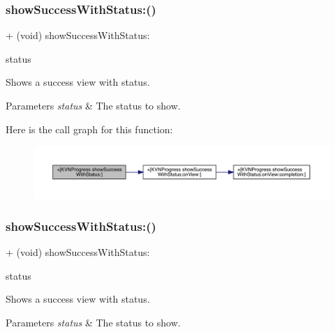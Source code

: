 \subsubsection{\texorpdfstring{show\+Success\+With\+Status\+:()}{showSuccessWithStatus:()}\hspace{0.1cm}{\footnotesize\ttfamily [1/3]}}
{\footnotesize\ttfamily + (void) show\+Success\+With\+Status\+: \begin{DoxyParamCaption}\item[{(N\+S\+String $\ast$)}]{status }\end{DoxyParamCaption}}

Shows a success view with {\ttfamily status}. 
\begin{DoxyParams}{Parameters}
{\em status} & The status to show. \\
\hline
\end{DoxyParams}
Here is the call graph for this function\+:\nopagebreak
\begin{figure}[H]
\begin{center}
\leavevmode
\includegraphics[width=350pt]{interface_k_v_n_progress_ae9b8b57302f6a4456658e758784790bf_cgraph}
\end{center}
\end{figure}
\mbox{\label{interface_k_v_n_progress_ae9b8b57302f6a4456658e758784790bf}} 
\subsubsection{\texorpdfstring{show\+Success\+With\+Status\+:()}{showSuccessWithStatus:()}\hspace{0.1cm}{\footnotesize\ttfamily [2/3]}}
{\footnotesize\ttfamily + (void) show\+Success\+With\+Status\+: \begin{DoxyParamCaption}\item[{(N\+S\+String $\ast$)}]{status }\end{DoxyParamCaption}}

Shows a success view with {\ttfamily status}. 
\begin{DoxyParams}{Parameters}
{\em status} & The status to show. \\
\hline
\end{DoxyParams}
\mbox{\label{interface_k_v_n_progress_ae9b8b57302f6a4456658e758784790bf}} 

